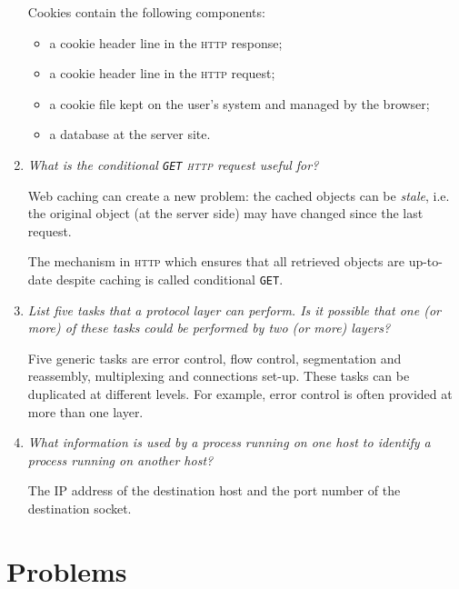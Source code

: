 \documentclass[11pt,a4paper]{article}
\begin{document}
\begin{enumerate}
  Cookies contain the following components:
  \begin{itemize}

    \item a cookie header line in the \textsc{http} response;

    \item a cookie header line in the \textsc{http} request;

    \item a cookie file kept on the user's system and managed by the
    browser;

    \item a database at the server site.

  \end{itemize}

  \item \emph{What is the conditional \texttt{GET} \textsc{http}
    request useful for?}

  Web caching can create a new problem: the cached objects can be
  \emph{stale}, i.e. the original object (at the server side) may have
  changed since the last request.

  The mechanism in \textsc{http} which ensures that all retrieved
  objects are up-to-date despite caching is called conditional
  \texttt{GET}.

  \item \emph{List five tasks that a protocol layer can perform. Is it
    possible that one (or more) of these tasks could be performed by
    two (or more) layers?}

  Five generic tasks are error control, flow control, segmentation and
  reassembly, multiplexing and connections set-up. These tasks can be
  duplicated at different levels. For example, error control is often
  provided at more than one layer.

  \item \emph{What information is used by a process running on one
    host to identify a process running on another host?}

  The IP address of the destination host and the port number of the
  destination socket.

\end{enumerate}

\section{Problems}
\end{document}
